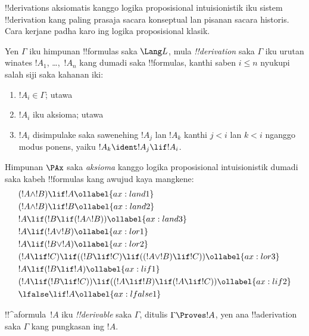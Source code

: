 \documentclass[../../../include/open-logic-section]{subfiles}
\begin{document}


!!{derivation}s aksiomatis kanggo logika proposisional intuisionistik
iku sistem !!{derivation} kang paling prasaja sacara konseptual lan
pisanan sacara historis. Cara kerjane padha karo ing logika
proposisional klasik.

\begin{defn}[!!^{derivability}]
Yen $\Gamma$ iku himpunan !!{formula}s saka $\Lang L$, mula
\emph{!!{derivation}} saka $\Gamma$ iku urutan winates $!A_1$,
\dots,~$!A_n$ kang dumadi saka !!{formula}s, kanthi saben $i \le n$
nyukupi salah siji saka kahanan iki:
\begin{enumerate}
\item $!A_i \in \Gamma$; utawa
\item $!A_i$ iku aksioma; utawa
\item $!A_i$ disimpulake saka sawenehing $!A_j$ lan $!A_k$ kanthi
  $j < i$ lan $k < i$ nganggo modus ponens, yaiku
  $!A_k \ident !A_j \lif !A_i$.
\end{enumerate}
\end{defn}

\begin{defn}[Aksioma]
Himpunan $\PAx$ saka \emph{aksioma} kanggo logika proposisional
intuisionistik dumadi saka kabeh !!{formula}s kang awujud kaya mangkene:
\begin{align}
  & (!A \land !B) \lif !A \ollabel{ax:land1}\\
  & (!A \land !B) \lif !B \ollabel{ax:land2}\\
  & !A \lif (!B \lif (!A \land !B)) \ollabel{ax:land3}\\
  & !A \lif (!A \lor !B) \ollabel{ax:lor1}\\
  & !A \lif (!B \lor !A) \ollabel{ax:lor2}\\
  & (!A \lif !C) \lif ((!B \lif !C) \lif ((!A \lor !B) \lif !C)) \ollabel{ax:lor3}\\
  & !A \lif (!B \lif !A) \ollabel{ax:lif1}\\
  & (!A \lif (!B \lif !C)) \lif ((!A \lif !B) \lif (!A \lif !C)) \ollabel{ax:lif2}\\
  & \lfalse \lif !A \ollabel{ax:lfalse1}
\end{align}
\end{defn}

\begin{defn}[!!^{derivability}]
!!^a{formula}~$!A$ iku \emph{!!{derivable}} saka $\Gamma$, ditulis
$\Gamma \Proves !A$, yen ana !!a{derivation} saka $\Gamma$ kang
pungkasan ing $!A$.
\end{defn}
\end{document}
